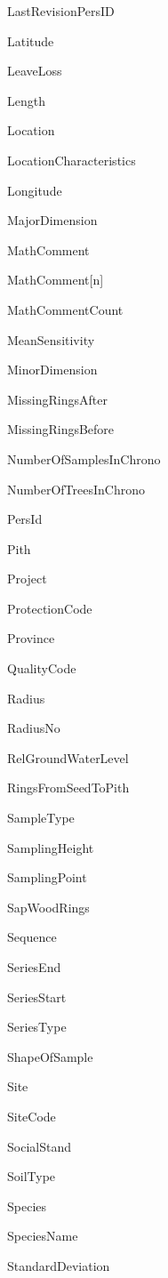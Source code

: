 \begin{multicols}{2}
\begin{itemize*}
 \item  LastRevisionPersID
 \item  Latitude
 \item  LeaveLoss
 \item  Length
 \item  Location
 \item  LocationCharacteristics
 \item  Longitude
 \item  MajorDimension
 \item  MathComment
 \item  MathComment[n]
 \item  MathCommentCount
 \item  MeanSensitivity
 \item  MinorDimension
 \item  MissingRingsAfter
 \item  MissingRingsBefore
 \item  NumberOfSamplesInChrono
 \item  NumberOfTreesInChrono
 \item  PersId
 \item  Pith
 \item  Project
 \item  ProtectionCode
 \item  Province
 \item  QualityCode
 \item  Radius
 \item  RadiusNo
 \item  RelGroundWaterLevel
 \item  RingsFromSeedToPith
 \item  SampleType
 \item  SamplingHeight
 \item  SamplingPoint
 \item  SapWoodRings
 \item  Sequence
 \item  SeriesEnd
 \item  SeriesStart
 \item  SeriesType
 \item  ShapeOfSample
 \item  Site
 \item  SiteCode
 \item  SocialStand
 \item  SoilType
 \item  Species
 \item  SpeciesName
 \item  StandardDeviation

\end{itemize*}
\end{multicols}
